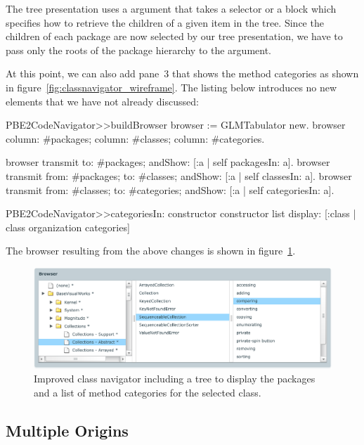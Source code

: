 \documentclass[a4paper,10pt,twoside]{book}
\begin{document}
The tree presentation uses a  argument that takes a
selector or a block which specifies how to retrieve the children of a
given item in the tree. Since the children of each package are now
selected by our tree presentation, we have to pass only the roots of
the package hierarchy to the  argument.

At this point, we can also add pane~3 that shows the method categories
as shown in figure~\ref{fig:classnavigator_wireframe}. The listing
below introduces no new elements that we have not already discussed:

\begin{code}{}
PBE2CodeNavigator>>buildBrowser 
  browser := GLMTabulator new.
  browser
    column: #packages;
    column:  #classes;
    column: #categories. 

  browser transmit to: #packages; andShow: [:a | self packagesIn: a].
  browser transmit from: #packages; to: #classes; andShow: [:a | self classesIn: a].
  browser transmit from: #classes; to: #categories; andShow: [:a | self categoriesIn: a].

PBE2CodeNavigator>>categoriesIn: constructor
  constructor list
    display:  [:class | class organization categories]  
\end{code}


The browser resulting from the above changes is shown in
figure~\ref{fig:treeandcategories}.

\begin{figure}[htbp]
\centerline{\includegraphics[width=\linewidth]{treeandcategories.pdf}}
\caption{	Improved class navigator including a tree to display the packages and a list of method categories for the selected class.}
\label{fig:treeandcategories}
\end{figure}



\subsection{Multiple Origins}
\end{document}
